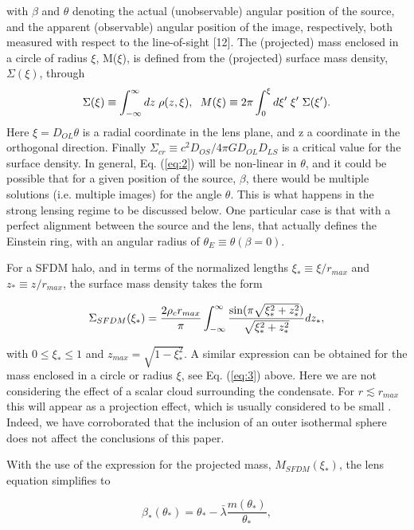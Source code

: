 \documentclass[10pt,twoside,twocolumn]{article}
\begin{document}
with $\beta$ and $\theta$ denoting the actual (unobservable) angular
position of the source, and the apparent (observable) angular position of the image, respectively, both measured
with respect to the line-of-sight [12]. The (projected)
mass enclosed in a circle of radius $\xi$, M($\xi$), is defined
from the (projected) surface mass density, $\Sigma(\xi)$, through
\begin{equation}
\footnotesize{
    \Sigma(\xi)\equiv\int_{-\infty}^{\infty} dz~\rho(z,\xi),~~M(\xi)\equiv 2\pi\int_{0}^{\xi}d\xi'~\xi'~\Sigma(\xi').
}
\label{eq:3}
\end{equation}
Here $\xi=D_{OL}\theta$ is a radial coordinate in the lens plane,
and z a coordinate in the orthogonal direction. Finally $\Sigma_{cr}\equiv c^2D_{OS}/4\pi GD_{OL}D_{LS}$ is a critical value for the surface density.
In general, Eq. (\ref{eq:2}) will be non-linear in $\theta$, and it could
be possible that for a given position of the source, $\beta$, there
would be multiple solutions (i.e. multiple images) for
the angle $\theta$. This is what happens in the strong lensing
regime to be discussed below. One particular case is that
with a perfect alignment between the source and the lens,
that actually defines the Einstein ring, with an angular
radius of $\theta_{E}\equiv\theta(\beta=0)$.\par
For a SFDM halo, and in terms of the normalized
lengths $\xi_*\equiv\xi/r_{max}$ and $z_{*}\equiv z/r_{max}$, the surface mass
density takes the form


\begin{equation}
\footnotesize{
    \Sigma_{SFDM}(\xi_*)=\frac{2\rho_cr_{max}}{\pi}\int_{-\infty}^{\infty}
    \frac{\sin(\pi\sqrt{\xi_*^2+z_*^2})}{\sqrt{\xi_*^2+z_*^2}}dz_*,
    }
    \label{eq:4}
\end{equation}

with $0 \leq \xi_* \leq 1$ and $z_{max}=\sqrt{1-\xi_*^2}$. A similar
expression can be obtained for the mass enclosed in a
circle or radius $\xi$, see Eq. (\ref{eq:3}) above. Here we are not
considering the effect of a scalar cloud surrounding the
condensate. For $r\lesssim r_{max}$ this will appear as a projection
effect, which is usually considered to be small \cite{13}. Indeed, we have corroborated that the inclusion of an outer
isothermal sphere does not affect the conclusions of this
paper.\par
With the use of the expression for the projected mass,
$M_{SFDM}(\xi_*)$, the lens equation simplifies to

    
\begin{equation} \tag{5a}
         \beta_*(\theta_*)=\theta_*-\bar{\lambda}\frac{m(\theta_*)}{\theta_*},
         \label{eq:5a}        
\end{equation}
\end{document}
